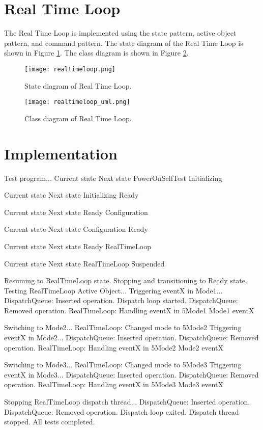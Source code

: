 \documentclass[../main.tex]{subfiles}
\begin{document}
\newpage

\section{Real Time Loop}

The Real Time Loop is implemented using the state pattern, active object pattern, and command pattern. The state diagram of the Real Time Loop is shown in Figure \ref{fig:rtl_state_diagram}. The class diagram is shown in Figure \ref{fig:rtl_implementation}.

\begin{figure}[h]
    \centering
    \texttt{[image: realtimeloop.png]}
    \caption{State diagram of Real Time Loop.}
    \label{fig:rtl_state_diagram}
\end{figure}

\begin{figure}[h]
    \centering
    \texttt{[image: realtimeloop\_uml.png]}
    \caption{Class diagram of Real Time Loop.}
    \label{fig:rtl_implementation}
\end{figure}

\newpage

\section{Implementation}

\begin{mintedterminal}
Test program...
Current state   Next state
PowerOnSelfTest Initializing

Current state   Next state
Initializing    Ready

Current state   Next state
Ready           Configuration

Current state   Next state
Configuration   Ready

Current state   Next state
Ready           RealTimeLoop

Current state   Next state
RealTimeLoop    Suspended

Resuming to RealTimeLoop state.
Stopping and transitioning to Ready state.
Testing RealTimeLoop Active Object...
Triggering eventX in Mode1...
DispatchQueue: Inserted operation.
Dispatch loop started.
DispatchQueue: Removed operation.
RealTimeLoop: Handling eventX in 5Mode1
Mode1 eventX

Switching to Mode2...
RealTimeLoop: Changed mode to 5Mode2
Triggering eventX in Mode2...
DispatchQueue: Inserted operation.
DispatchQueue: Removed operation.
RealTimeLoop: Handling eventX in 5Mode2
Mode2 eventX

Switching to Mode3...
RealTimeLoop: Changed mode to 5Mode3
Triggering eventX in Mode3...
DispatchQueue: Inserted operation.
DispatchQueue: Removed operation.
RealTimeLoop: Handling eventX in 5Mode3
Mode3 eventX

Stopping RealTimeLoop dispatch thread...
DispatchQueue: Inserted operation.
DispatchQueue: Removed operation.
Dispatch loop exited.
Dispatch thread stopped.
All tests completed.
\end{mintedterminal}
\end{document}
